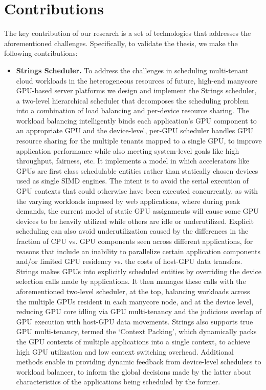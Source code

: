 \section{Contributions}
The key contribution of our research is a set of technologies that addresses the aforementioned challenges. Specifically, to validate the thesis, we make the following contributions:
\begin{itemize}
\item \textbf{Strings Scheduler.} To address the challenges in scheduling multi-tenant cloud workloads in the heterogeneous resources of future, high-end manycore GPU-based server platforms we design and implement the Strings scheduler, a two-level hierarchical scheduler that decomposes the scheduling problem into a combination of load balancing and per-device resource sharing. The workload balancing intelligently binds each application’s GPU component to an appropriate GPU and the device-level, per-GPU scheduler handles GPU resource sharing for the multiple tenants mapped to a single GPU, to improve application performance while also meeting system-level goals like high throughput, fairness, etc. It implements a model in which accelerators like GPUs are first class schedulable entities rather than statically chosen devices used as single SIMD engines. The intent is to avoid the serial execution of GPU contexts that could otherwise have been executed concurrently, as with the varying workloads imposed by web applications, where during peak demands, the current model of static GPU assignments will cause some GPU devices to be heavily utilized while others are idle or underutilized. Explicit scheduling can also avoid underutilization caused by the differences in the fraction of CPU vs. GPU components seen across different applications, for reasons that include an inability to parallelize certain application components and/or limited GPU residency vs. the costs of host-GPU data transfers. Strings makes GPUs into explicitly scheduled entities by overriding the device selection calls made by applications. It then manages these calls with the aforementioned two-level scheduler, at the top, balancing workloads across the multiple GPUs resident in each manycore node, and at the device level, reducing GPU core idling via GPU multi-tenancy and the judicious overlap of GPU execution with host-GPU data movements. Strings also supports true GPU multi-tenancy, termed the `Context Packing', which dynamically packs the GPU contexts of multiple applications into a single context, to achieve high GPU utilization and low context switching overhead. Additional methods enable in providing dynamic feedback from device-level schedulers to workload balancer, to inform the global decisions made by the latter about characteristics of the applications being scheduled by the former.


\end{itemize}
